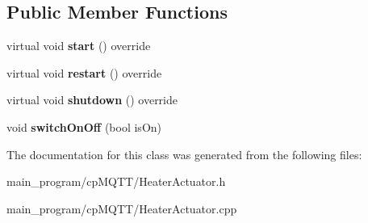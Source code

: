 \subsection*{Public Member Functions}
\begin{DoxyCompactItemize}
\item 
virtual void {\bfseries start} () override\hypertarget{class_heater_actuator_a1f7503b0bac4dec5061bcb6841784d93}{}\label{class_heater_actuator_a1f7503b0bac4dec5061bcb6841784d93}

\item 
virtual void {\bfseries restart} () override\hypertarget{class_heater_actuator_a55183efbe026a985f10d43fc049c0679}{}\label{class_heater_actuator_a55183efbe026a985f10d43fc049c0679}

\item 
virtual void {\bfseries shutdown} () override\hypertarget{class_heater_actuator_a0cf2f109b1c0822baf35550cc2a6d393}{}\label{class_heater_actuator_a0cf2f109b1c0822baf35550cc2a6d393}

\item 
void {\bfseries switch\+On\+Off} (bool is\+On)\hypertarget{class_heater_actuator_ab1724370bf8a263f11cca9060315b36b}{}\label{class_heater_actuator_ab1724370bf8a263f11cca9060315b36b}

\end{DoxyCompactItemize}


The documentation for this class was generated from the following files\+:\begin{DoxyCompactItemize}
\item 
main\+\_\+program/cp\+M\+Q\+T\+T/Heater\+Actuator.\+h\item 
main\+\_\+program/cp\+M\+Q\+T\+T/Heater\+Actuator.\+cpp\end{DoxyCompactItemize}
